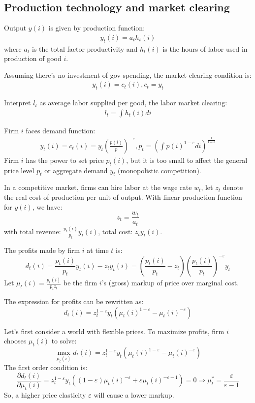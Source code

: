 \subsection{Production technology and market clearing}
Output $y(i)$ is given by production function:
\begin{align*}
    y_t(i) = a_t h_t(i)
\end{align*}
where $a_t$ is the total factor productivity and $h_t(i)$ is the hours of labor used in production of good $i$.

Assuming there's no investment of gov spending, the market clearing condition is:
\begin{align*}
    y_t(i) = c_t(i), c_t = y_t
\end{align*}

Interpret $l_t$ as average labor supplied per good, the labor market clearing:
\begin{align*}
    l_t = \int h_t(i) di
\end{align*}

Firm $i$ faces demand function:
\begin{align*}
    y_t(i) = c_t(i) = y_t \left( \frac{p(i)}{p} \right)^{-\varepsilon}, p_t = \left( \int p(i)^{1-\varepsilon} di \right)^{\frac{1}{1-\varepsilon}}
\end{align*}
Firm $i$ has the power to set price $p_t(i)$, but it is too small to affect
the general price level $p_t$ or aggregate demand $y_t$ (monopolistic
competition).

In a competitive market, firms can hire labor at the wage rate $w_t$, let $z_t$ denote the real cost of production
per unit of output. With linear production function for $y(i)$, we have:
\[
z_t = \frac{w_t}{a_t}
\]
with total revenue: $\frac{p_t(i)}{p_t} y_t(i)$, total cost: $z_t y_t(i)$.

The profits made by firm $i$ at time $t$ is:
\[
d_t(i) = \frac{p_t(i)}{p_t} y_t(i) - z_t y_t(i) = \left(\frac{p_t(i)}{p_t}-z_t\right)\left(\frac{p_t(i)}{p_t}\right)^{-\varepsilon}y_t
\]
Let $\mu_t(i) = \frac{p_t(i)}{p_t z_t}$ be the firm $i$'s (gross) markup of price over marginal cost.

The expression for profits can be rewritten as:
\[
d_t(i) = z_t^{1-\varepsilon}y_t (\mu_t(i)^{1-\varepsilon} - \mu_t(i)^{-\varepsilon})
\]

Let's first consider a world with flexible prices. To maximize profits, firm $i$ chooses $\mu_t(i)$ to solve:
\[
\max_{\mu_t(i)} d_t(i) = z_t^{1-\varepsilon}y_t (\mu_t(i)^{1-\varepsilon} - \mu_t(i)^{-\varepsilon})
\]
The first order condition is:
\[
\frac{\partial d_t(i)}{\partial \mu_t(i)} = z_t^{1-\varepsilon}y_t ((1-\varepsilon)\mu_t(i)^{-\varepsilon} + \varepsilon \mu_t(i)^{-\varepsilon-1}) = 0 \Rightarrow \mu_t^* = \frac{\varepsilon}{\varepsilon-1}
\]
So, a higher price elasticity $\varepsilon$ will cause a lower markup.

